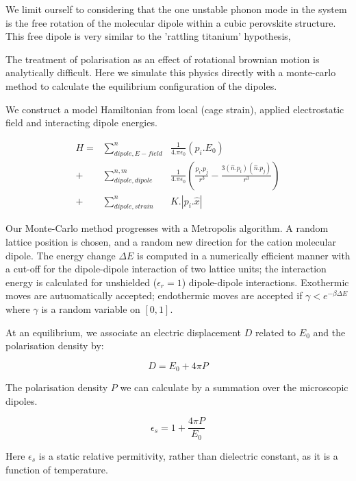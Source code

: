 \documentclass[journal=jacsat,manuscript=communication]{achemso}
\begin{document}
We limit ourself to considering that the one unstable phonon mode in the system is the free rotation of the molecular dipole within a cubic perovskite structure. This free dipole is very similar to the 'rattling titanium' hypothesis, 

The treatment of polarisation as an effect of rotational brownian motion is analytically difficult\cite{mcconnell_rotational_1980}.
Here we simulate this physics directly with a monte-carlo method to calculate the equilibrium configuration of the dipoles.

We construct a model Hamiltonian from local (cage strain), applied electrostatic field and interacting dipole energies.

\begin{align}
H = &\sum^n_{dipole,E-field} &\frac{1}{4.\pi \epsilon_0} (p_i.E_0) \\
+ &\sum^{n,m}_{dipole,dipole} &\frac{1}{4.\pi \epsilon_0} (\frac{p_i.p_j}{r^3}-\frac{3(\hat{n}.p_i)(\hat{n}.p_j)}{r^3}) \\
+ &\sum^n_{dipole,strain} &K.|p_i.\hat{x}|
\end{align}  

Our Monte-Carlo method progresses with a Metropolis algorithm. 
A random lattice position is chosen, and a random new direction for the cation molecular dipole. 
The energy change $\Delta E$ is computed in a numerically efficient manner with a cut-off for the dipole-dipole interaction of two lattice units; the interaction energy is calculated for unshielded ($\epsilon_r =1$) dipole-dipole interactions. 
Exothermic moves are autuomatically accepted; endothermic moves are accepted if $\gamma < e^{-\beta \Delta E}$ where $\gamma$ is a random variable on $[0,1]$.

At an equilibrium, we associate an electric displacement $D$ related to $E_0$ and the polarisation density by:

\begin{equation}
D =  E_0 + 4\pi P
\end{equation}

The polarisation density $P$ we can calculate by a summation over the microscopic dipoles. 

\begin{equation}
\epsilon_s = 1+ \frac{4\pi P}{E_0}
\end{equation}

Here $\epsilon_s$ is a static relative permitivity, rather than dielectric constant, as it is a function of temperature.
\end{document}
